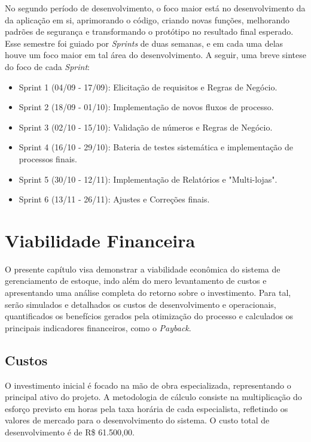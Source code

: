 \documentclass[
	12pt,				%
	openany,			%
	twoside,			%
	a4paper,			%
	english,			%
	brazil				%
	]{abntex2}
\begin{document}
No segundo período de desenvolvimento, o foco maior está no desenvolvimento da da aplicação em si, aprimorando o código, criando novas funções, melhorando padrões de segurança e transformando o protótipo no resultado final esperado. Esse semestre foi guiado por \textit{Sprints} de duas semanas, e em cada uma delas houve um foco maior em tal área do desenvolvimento. A seguir, uma breve sintese do foco de cada \textit{Sprint}:

\begin{itemize}

\item Sprint 1 (04/09 - 17/09): Elicitação de requisitos e Regras de Negócio.

\item Sprint 2 (18/09 - 01/10): Implementação de novos fluxos de processo.

\item Sprint 3 (02/10 - 15/10): Validação de números e Regras de Negócio.

\item Sprint 4 (16/10 - 29/10): Bateria de testes sistemática e implementação de processos finais.

\item Sprint 5 (30/10 - 12/11): Implementação de Relatórios e "Multi-lojas".

\item Sprint 6 (13/11 - 26/11): Ajustes e Correções finais.


\end{itemize}
\chapter{Viabilidade Financeira}

O presente capítulo visa demonstrar a viabilidade econômica do sistema de gerenciamento de estoque, indo além do mero levantamento de custos e apresentando uma análise completa do retorno sobre o investimento. Para tal, serão simulados e detalhados os custos de desenvolvimento e operacionais, quantificados os benefícios gerados pela otimização do processo e calculados os principais indicadores financeiros, como o \textit{Payback}.

\section{Custos}

O investimento inicial é focado na mão de obra especializada, representando o principal ativo do projeto. A metodologia de cálculo consiste na multiplicação do esforço previsto em horas pela taxa horária de cada especialista, refletindo os valores de mercado para o desenvolvimento do sistema. O custo total de desenvolvimento é de R\$ 61.500,00.
\end{document}
